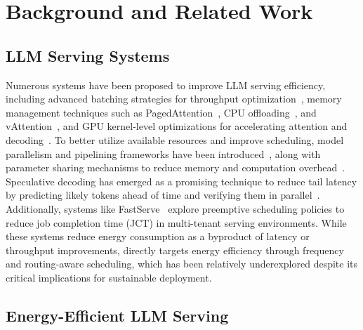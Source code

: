 \section{Background and Related Work} 
\label{sec:bg}

\subsection{LLM Serving Systems} 
\label{subsec:bg-llm}



Numerous systems have been proposed to improve LLM serving efficiency, including advanced batching strategies for throughput optimization~\cite{fang2021turbotransformers,yu2022orca}, memory management techniques such as PagedAttention~\cite{kwon2023efficient}, CPU offloading~\cite{xu2024pie,sheng2023flexgen}, and vAttention~\cite{prabhu2025vattention}, and GPU kernel-level optimizations for accelerating attention and decoding~\cite{aminabadi2022deepspeed, dao2023flashattention2,fastertransformer,wang2021lightseq,shah2024flashattention}. To better utilize available resources and improve scheduling, model parallelism and pipelining frameworks have been introduced~\cite{aminabadi2022deepspeed,li2023alpaserve,pope2023efficiently}, along with parameter sharing mechanisms to reduce memory and computation overhead~\cite{sheng2023s}. Speculative decoding has emerged as a promising technique to reduce tail latency by predicting likely tokens ahead of time and verifying them in parallel~\cite{miao2024specinfer,stern2018blockwise}. Additionally, systems like FastServe~\cite{wu2023fast} explore preemptive scheduling policies to reduce job completion time (JCT) in multi-tenant serving environments. While these systems reduce energy consumption as a byproduct of latency or throughput improvements,  \name directly targets energy efficiency through frequency and routing-aware scheduling, which has been relatively underexplored despite its critical implications for sustainable deployment. 

\subsection{Energy-Efficient LLM Serving} 
\label{sec:bg-energy}

